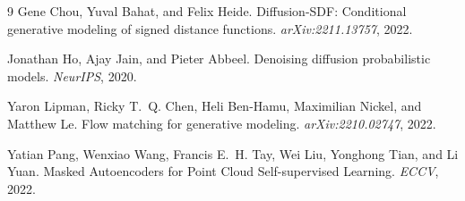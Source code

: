 \documentclass[11pt,letterpaper]{article}
\begin{document}
\begin{thebibliography}{9}
Gene Chou, Yuval Bahat, and Felix Heide.
\newblock Diffusion-SDF: Conditional generative modeling of signed distance functions.
\newblock \emph{arXiv:2211.13757}, 2022.

Jonathan Ho, Ajay Jain, and Pieter Abbeel.
\newblock Denoising diffusion probabilistic models.
\newblock \emph{NeurIPS}, 2020.

Yaron Lipman, Ricky T.~Q. Chen, Heli Ben-Hamu, Maximilian Nickel, and Matthew Le.
\newblock Flow matching for generative modeling.
\newblock \emph{arXiv:2210.02747}, 2022.

Yatian Pang, Wenxiao Wang, Francis E.~H. Tay, Wei Liu, Yonghong Tian, and Li Yuan.
\newblock Masked Autoencoders for Point Cloud Self-supervised Learning.
\newblock \emph{ECCV}, 2022.
\end{thebibliography}
\end{document}
